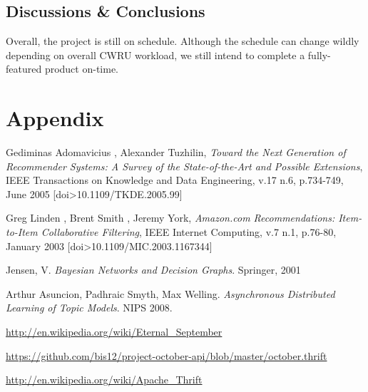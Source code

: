 \documentclass[11pt,letterpaper]{article}
\begin{document}
\subsection{Discussions \& Conclusions}
Overall, the project is still on schedule.
Although the schedule can change wildly depending on overall CWRU workload, we still intend to complete a fully-featured product on-time.

\section{Appendix}

\newpage
\newpage
\begin{thebibliography}{6}
   Gediminas Adomavicius , Alexander Tuzhilin, \textit{Toward the Next Generation of Recommender Systems: A Survey of the State-of-the-Art and Possible Extensions}, IEEE Transactions on Knowledge and Data Engineering, v.17 n.6, p.734-749, June 2005  [doi>10.1109/TKDE.2005.99]

   Greg Linden , Brent Smith , Jeremy York, \textit{Amazon.com Recommendations: Item-to-Item Collaborative Filtering}, IEEE Internet Computing, v.7 n.1, p.76-80, January 2003  [doi>10.1109/MIC.2003.1167344]

   Jensen, V. \textit{Bayesian Networks and Decision Graphs}. Springer, 2001

   Arthur Asuncion, Padhraic Smyth, Max Welling. \textit{Asynchronous Distributed Learning of Topic Models}. NIPS 2008.

   \url{http://en.wikipedia.org/wiki/Eternal\_September}

   \url{https://github.com/bis12/project-october-api/blob/master/october.thrift}

   \url{http://en.wikipedia.org/wiki/Apache\_Thrift}

\end{thebibliography}
\end{document}
